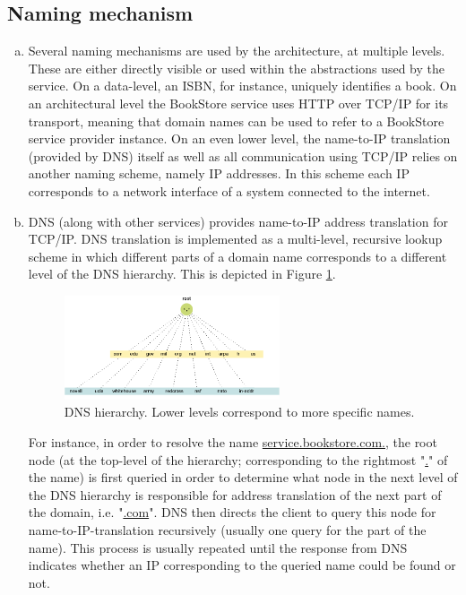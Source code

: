 \documentclass[11pt,a4paper,english]{article}
\begin{document}
\subsection{Naming mechanism}
\begin{enumerate}[(a)]
\item{Several naming mechanisms are used by the architecture, at multiple
    levels. These are either directly visible or used within the abstractions
    used by the service. On a data-level, an ISBN, for instance, uniquely
    identifies a book. On an architectural level the BookStore service uses HTTP
    over TCP/IP for its transport, meaning that domain names can be used to
    refer to a BookStore service provider instance. On an even lower level, the
    name-to-IP translation (provided by DNS) itself as well as all communication
    using TCP/IP relies on another naming scheme, namely IP addresses. In this scheme each IP corresponds to a network interface of a system connected to the internet.}

\item{DNS (along with other services) provides name-to-IP address translation
    for TCP/IP. DNS translation is implemented as a multi-level, recursive
    lookup scheme in which different parts of a domain name corresponds to a
    different level of the DNS hierarchy. This is depicted in Figure
    \ref{fig:dns}.

\begin{figure}[!hbt]
    \centering
    \includegraphics[width=0.6\textwidth]{img/dns.png}
    \caption{DNS hierarchy. Lower levels correspond to more specific names.}
    \label{fig:dns}
\end{figure}

For instance, in order to resolve the name \url{service.bookstore.com.}, the root node (at the top-level of the hierarchy; corresponding to the rightmost "\url{.}" of the name) is first queried in order to determine what node in the next level of the DNS hierarchy is responsible for address translation of the next part of the domain, i.e. "\url{.com}". DNS then directs the client to query this node for name-to-IP-translation recursively (usually one query for the part of the name). This process is usually repeated until the response from DNS indicates whether an IP corresponding to the queried name could be found or not.}

\end{enumerate}
\end{document}
